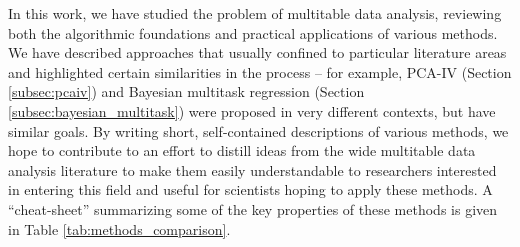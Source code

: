 \documentclass{article}
\begin{document}
In this work, we have studied the problem of multitable data analysis, reviewing
both the algorithmic foundations and practical applications of various methods.
We have described approaches that usually confined to particular literature
areas and highlighted certain similarities in the process -- for example, PCA-IV
(Section \ref{subsec:pcaiv}) and Bayesian multitask regression (Section
\ref{subsec:bayesian_multitask}) were proposed in very different contexts, but
have similar goals. By writing short, self-contained descriptions of various
methods, we hope to contribute to an effort to distill ideas from the wide
multitable data analysis literature to make them easily understandable to
researchers interested in entering this field and useful for scientists hoping
to apply these methods. A ``cheat-sheet'' summarizing some of the key properties
of these methods is given in Table \ref{tab:methods_comparison}.
\end{document}
